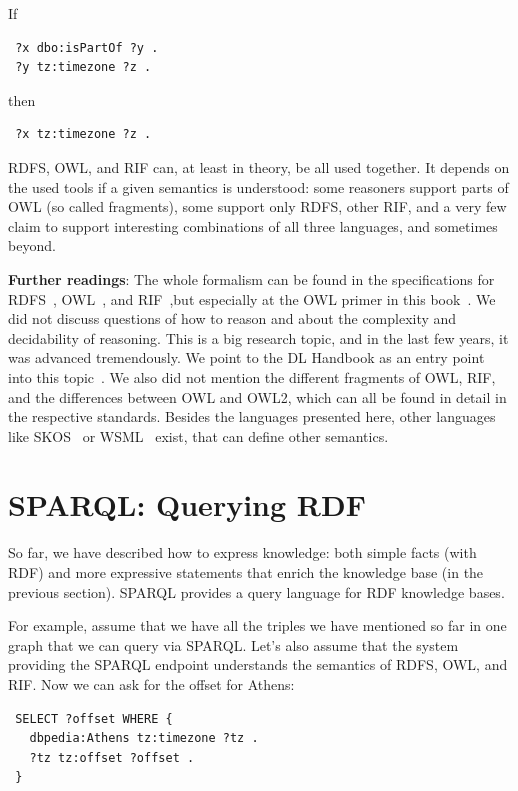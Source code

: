 If
\begin{verbatim}
 ?x dbo:isPartOf ?y .
 ?y tz:timezone ?z .
\end{verbatim}
then
\begin{verbatim}
 ?x tz:timezone ?z .
\end{verbatim}

RDFS, OWL, and RIF can, at least in theory, be all used together.
It depends on the used tools if a given semantics is understood: some reasoners support parts of OWL (so called fragments), some support only RDFS, other RIF, and a very few claim to support interesting combinations of all three languages, and sometimes beyond.

\medskip

\textbf{Further readings}:
The whole formalism can be found in the specifications for RDFS~\cite{rdfs}, OWL~\cite{owl}, and RIF~\cite{rif},but especially at the OWL primer in this book~\cite{dl-primer}.
We did not discuss questions of how to reason and about the complexity and decidability of reasoning. 
This is a big research topic, and in the last few years, it was advanced tremendously. 
We point to the DL Handbook as an entry point into this topic~\cite{dl-handbook}.
We also did not mention the different fragments of OWL, RIF, and the differences between OWL and OWL2, which can all be found in detail in the respective standards.
Besides the languages presented here, other languages like SKOS~\cite{skos} or WSML~\cite{wsml} exist, that can define other semantics.

\section{SPARQL: Querying RDF}
\label{sparql}

So far, we have described how to express knowledge: both simple facts (with RDF) and more expressive statements that enrich the knowledge base (in the previous section).
SPARQL provides a query language for RDF knowledge bases.

For example, assume that we have all the triples we have mentioned so far in one graph that we can query via SPARQL.
Let's also assume that the system providing the SPARQL endpoint understands the semantics of RDFS, OWL, and RIF.
Now we can ask for the offset for Athens:

\begin{verbatim}
 SELECT ?offset WHERE {
   dbpedia:Athens tz:timezone ?tz .
   ?tz tz:offset ?offset .
 }
\end{verbatim}

